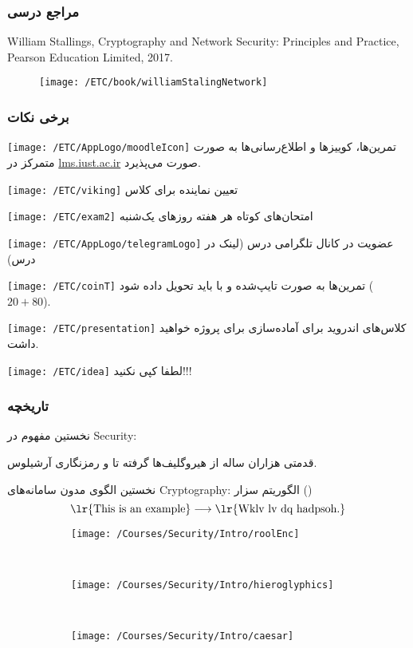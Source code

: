 \documentclass[10pt]{report}
\begin{document}
\clearpage
\frametitle{مراجع درسی}
\begin{latin}
\noindent [1] William Stallings, Cryptography and Network Security: Principles and Practice, Pearson Education Limited, 2017.
\end{latin}
\vfill
\begin{figure}[H]
\texttt{[image: /ETC/book/williamStalingNetwork]}
\end{figure}
\vfill

\clearpage
\frametitle{برخی نکات}
\texttt{[image: /ETC/AppLogo/moodleIcon]}
تمرین‌ها، کوییزها و اطلاع‌رسانی‌ها به صورت متمرکز در 
\url{lms.iust.ac.ir}
صورت می‌پذیرد. 

\texttt{[image: /ETC/viking]}
تعیین نماینده برای کلاس

\texttt{[image: /ETC/exam2]}
امتحان‌های کوتاه هر هفته روزهای یک‌شنبه

\texttt{[image: /ETC/AppLogo/telegramLogo]}
عضویت در کانال تلگرامی درس (لینک در 
\href{lms.iust.ac.ir}{} درس)

\texttt{[image: /ETC/coinT]}
تمرین‌ها به صورت تایپ‌شده و با 
\lr{\LaTeX}
باید تحویل داده شود
($20+80$).

\texttt{[image: /ETC/presentation]}
کلاس‌های اندروید برای آماده‌سازی برای پروژه خواهید داشت. 

\texttt{[image: /ETC/idea]}
لطفا کپی نکنید!!!



\clearpage
\frametitle{تاریخچه }

\handO
نخستین مفهوم در
\gls{Security}: 

\handO
قدمتی هزاران ساله از هیروگلیف‌ها گرفته تا 
و رمزنگاری آرشیلوس.

\handO
نخستین الگوی مدون سامانه‌های
\gls{Cryptography}: الگوریتم سزار ()
\begin{equation*}
\text{\lr{This is an example}} \longrightarrow \text{\lr{Wklv lv dq hadpsoh.}}
\end{equation*}


\vfill
\begin{figure}[H]
\centering
\begin{subfigure}[b]{0.35\textwidth}\centering
\texttt{[image: /Courses/Security/Intro/roolEnc]}
\end{subfigure}
~ 
\begin{subfigure}[b]{0.35\textwidth}\centering
\texttt{[image: /Courses/Security/Intro/hieroglyphics]}
\end{subfigure}
~
\begin{subfigure}[b]{0.27\textwidth}\centering
\texttt{[image: /Courses/Security/Intro/caesar]}
\end{subfigure}
\end{figure}
\vfill
\end{document}
